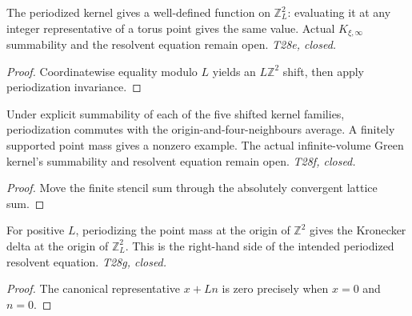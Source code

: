 \begin{lemma}
  \label{lem:periodize-descend}
  \leanok
  The periodized kernel gives a well-defined function on $\mathbb Z_L^2$:
  evaluating it at any integer representative of a torus point gives the
  same value. Actual $K_{\xi,\infty}$ summability and the resolvent equation
  remain open. \emph{T28e, closed.}
\end{lemma}
\begin{proof}\leanok
  Coordinatewise equality modulo $L$ yields an $L\mathbb Z^2$ shift, then
  apply periodization invariance.
\end{proof}

\begin{lemma}
  \label{lem:periodize-stencil}
  \leanok
  Under explicit summability of each of the five shifted kernel families,
  periodization commutes with the origin-and-four-neighbours average.
  A finitely supported point mass gives a nonzero example. The actual
  infinite-volume Green kernel's summability and resolvent equation remain
  open. \emph{T28f, closed.}
\end{lemma}
\begin{proof}\leanok
  Move the finite stencil sum through the absolutely convergent lattice sum.
\end{proof}

\begin{lemma}
  \label{lem:periodize-delta}
  \leanok
  For positive $L$, periodizing the point mass at the origin of $\mathbb Z^2$
  gives the Kronecker delta at the origin of $\mathbb Z_L^2$. This is the
  right-hand side of the intended periodized resolvent equation.
  \emph{T28g, closed.}
\end{lemma}
\begin{proof}\leanok
  The canonical representative $x+Ln$ is zero precisely when $x=0$ and $n=0$.
\end{proof}

